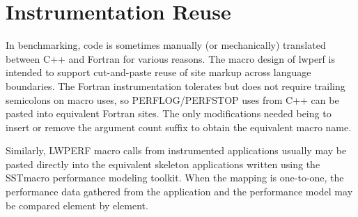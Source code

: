 
\chapter{Instrumentation Reuse}\label{sec:reuse}
In benchmarking, code is sometimes manually (or mechanically) translated
between C++ and Fortran for various reasons. The macro design of lwperf
is intended to support cut-and-paste reuse of site markup
across language boundaries. The Fortran instrumentation tolerates but
does not require trailing semicolons on macro uses, so PERFLOG/PERFSTOP uses
from C++ can be pasted into equivalent Fortran sites. The only modifications
needed being to insert or remove the argument count suffix to obtain the equivalent macro name.

Similarly, LWPERF macro calls from instrumented applications usually may be pasted directly into the equivalent skeleton applications written using the SSTmacro performance modeling toolkit\cite{ref:sstmac}. When the mapping is one-to-one, the performance data gathered from the application and the performance model may be compared element by element.

